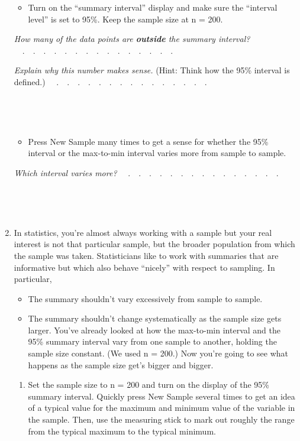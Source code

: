 \documentclass[nofonts,]{tufte-handout}
\providecommand{\tightlist}{%
  \setlength{\itemsep}{0pt}\setlength{\parskip}{0pt}}
\begin{document}
\begin{enumerate}
  \begin{itemize}
  \tightlist
  \item
    Turn on the ``summary interval'' display and make sure the
    ``interval level'' is set to 95\%. Keep the sample size at n = 200.
  \end{itemize}

  \emph{How many of the data points are \textbf{outside} the summary
  interval?} ~~.~~.~~.~~.~~.~~.~~.~~.~~.~~.~~.~~.~~.~~.~~. ~

  \emph{Explain why this number makes sense.} (Hint: Think how the 95\%
  interval is defined.) ~~.~~.~~.~~.~~.~~.~~.~~.~~.~~.~~.~~.~~.~~.~~. ~

  ~

  ~

  \begin{itemize}
  \tightlist
  \item
    Press New Sample many times to get a sense for whether the 95\%
    interval or the max-to-min interval varies more from sample to
    sample.
  \end{itemize}

  \emph{Which interval varies more?}
  ~~.~~.~~.~~.~~.~~.~~.~~.~~.~~.~~.~~.~~.~~.~~. ~

  ~

  ~
\item
  In statistics, you're almost always working with a sample but your
  real interest is not that particular sample, but the broader
  population from which the sample was taken. Statisticians like to work
  with summaries that are informative but which also behave ``nicely''
  with respect to sampling. In particular,

  \begin{itemize}
  \tightlist
  \item
    The summary shouldn't vary excessively from sample to sample.
  \item
    The summary shouldn't change systematically as the sample size gets
    larger. You've already looked at how the max-to-min interval and the
    95\% summary interval vary from one sample to another, holding the
    sample size constant. (We used n = 200.) Now you're going to see
    what happens as the sample size get's bigger and bigger.
  \end{itemize}

  \begin{enumerate}
  \def\labelenumii{\alph{enumii}.}
  \item
    Set the sample size to n = 200 and turn on the display of the 95\%
    summary interval. Quickly press New Sample several times to get an
    idea of a typical value for the maximum and minimum value of the
    variable in the sample. Then, use the measuring stick to mark out
    roughly the range from the typical maximum to the typical minimum.


\end{enumerate}
\end{enumerate}
\end{document}
